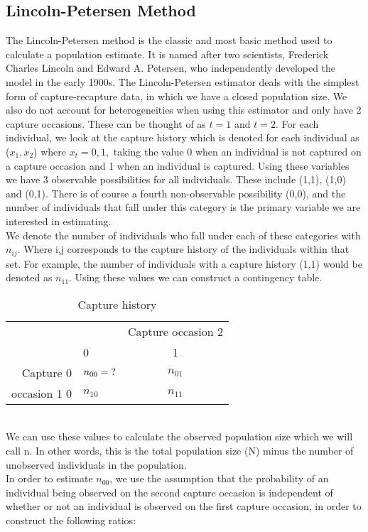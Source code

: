 \documentclass[,oneside]{article}
\numberwithin{equation}{section}
\begin{document}
\subsection{Lincoln-Petersen Method}
The Lincoln-Petersen method is the classic and most basic method used to calculate a population estimate. It is named after two scientists, Frederick Charles Lincoln and Edward A. Petersen, who independently developed the model in the early 1900s. The Lincoln-Petersen estimator deals with the simplest form of capture-recapture data, in which we have a closed population size. We also do not account for heterogeneities when using this estimator and only have 2 capture occasions. These can be thought of as $t=1$ and $t=2$. For each individual, we look at the capture history which is denoted for each individual as ($x_1, x_2$) where $x_t= 0,1,$ taking the value 0 when an individual is not captured on a capture occasion and 1 when an individual is captured. Using these variables we have 3 observable possibilities for all individuals. These include (1,1), (1,0) and (0,1). There is of course a fourth non-observable possibility (0,0), and the number of individuals that fall under this category is the primary variable we are interested in estimating.\\
We denote the number of individuals who fall under each of these categories with $n_{ij}$. Where i,j corresponds to the capture history of the individuals within that set. For example, the number of individuals with a capture history (1,1) would be denoted as $n_{11}$. Using these values we can construct a contingency table. 
\begin{table}[h]
\centering
\begin{tabular}{rlc}
&&Capture occasion 2 \\
 \vline & 0 & 1 \\
\hline
Capture 0 \vline & $n_{00}= \hspace{0.1cm}?$ & $n_{01}$ \\
occasion 1 0 \vline & $n_{10}$ & $n_{11}$

\end{tabular}
\caption{Capture history}
\label{tab:CaptureHistory}
\end{table}\\
We can use these values to calculate the observed population size which we will call n. In other words, this is the total population size (N) minus the number of unobserved individuals in the population. \\
In order to estimate $n_{00}$, we use the assumption that the probability of an individual being observed on the second capture occasion is independent of whether or not an individual is observed on the first capture occasion, in order to construct the following ratios:
\end{document}
